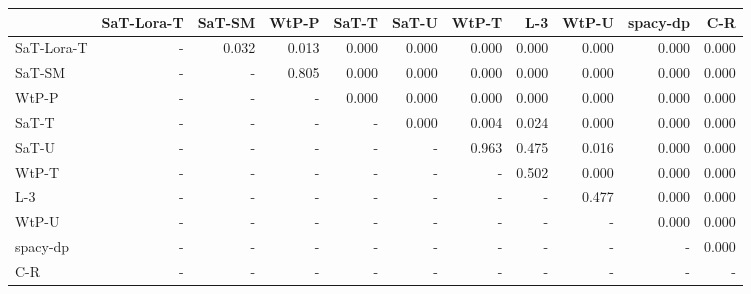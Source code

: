\begin{tabular}{lrrrrrrrrrr}
\toprule
 & SaT-Lora-T & SaT-SM & WtP-P & SaT-T & SaT-U & WtP-T & L-3 & WtP-U & spacy-dp & C-R \\
\midrule
SaT-Lora-T & - & 0.032 & 0.013 & 0.000 & 0.000 & 0.000 & 0.000 & 0.000 & 0.000 & 0.000 \\
SaT-SM & - & - & 0.805 & 0.000 & 0.000 & 0.000 & 0.000 & 0.000 & 0.000 & 0.000 \\
WtP-P & - & - & - & 0.000 & 0.000 & 0.000 & 0.000 & 0.000 & 0.000 & 0.000 \\
SaT-T & - & - & - & - & 0.000 & 0.004 & 0.024 & 0.000 & 0.000 & 0.000 \\
SaT-U & - & - & - & - & - & 0.963 & 0.475 & 0.016 & 0.000 & 0.000 \\
WtP-T & - & - & - & - & - & - & 0.502 & 0.000 & 0.000 & 0.000 \\
L-3 & - & - & - & - & - & - & - & 0.477 & 0.000 & 0.000 \\
WtP-U & - & - & - & - & - & - & - & - & 0.000 & 0.000 \\
spacy-dp & - & - & - & - & - & - & - & - & - & 0.000 \\
C-R & - & - & - & - & - & - & - & - & - & - \\
\bottomrule
\end{tabular}


